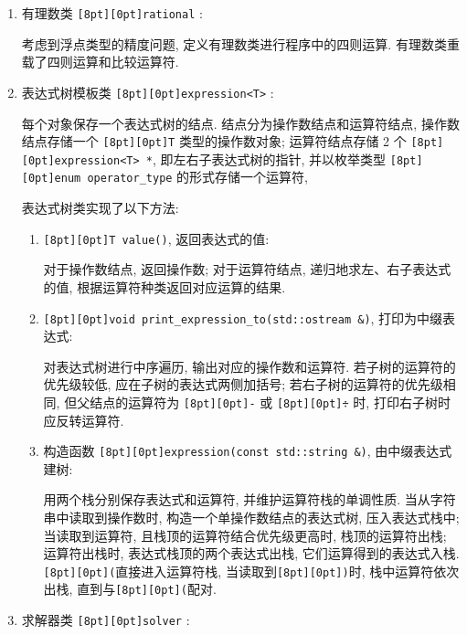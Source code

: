 \documentclass{ctexart}
\newcommand{\codebox}[1]{\colorbox[rgb]{0.9, 0.9, 0.9}{\texttt{\raisebox{0pt}[8pt][0pt]{#1}}}}
\begin{document}
\begin{enumerate}[itemindent=0pt, leftmargin=14pt]
    \item 有理数类 \codebox{rational} :
    
    考虑到浮点类型的精度问题, 定义有理数类进行程序中的四则运算. 有理数类重载了四则运算和比较运算符.

    \item 表达式树模板类 \codebox{expression<T>} :
    
    每个对象保存一个表达式树的结点. 结点分为操作数结点和运算符结点, 
    操作数结点存储一个 \codebox{T} 类型的操作数对象;
    运算符结点存储 2 个 \codebox{expression<T> *}, 即左右子表达式树的指针,
    并以枚举类型 \codebox{enum operator\_type} 的形式存储一个运算符,

    表达式树类实现了以下方法:

    \begin{enumerate}[itemindent=0pt, leftmargin=16pt]
        \item \codebox{T value()}, 返回表达式的值:
        
        对于操作数结点, 返回操作数; 对于运算符结点, 递归地求左、右子表达式的值, 根据运算符种类返回对应运算的结果.
        
        \item \codebox{void print\_expression\_to(std::ostream \&)}, 打印为中缀表达式:
        
        对表达式树进行中序遍历, 输出对应的操作数和运算符. 
        若子树的运算符的优先级较低, 应在子树的表达式两侧加括号;
        若右子树的运算符的优先级相同, 但父结点的运算符为 \codebox{-} 或 \codebox{÷} 时,
        打印右子树时应反转运算符.
        
        \item 构造函数 \codebox{expression(const std::string \&)}, 由中缀表达式建树:

        用两个栈分别保存表达式和运算符, 并维护运算符栈的单调性质.
        当从字符串中读取到操作数时, 构造一个单操作数结点的表达式树, 压入表达式栈中;
        当读取到运算符, 且栈顶的运算符结合优先级更高时, 栈顶的运算符出栈;
        运算符出栈时, 表达式栈顶的两个表达式出栈, 它们运算得到的表达式入栈.
        \codebox{(}直接进入运算符栈, 当读取到\codebox{)}时, 栈中运算符依次出栈, 直到与\codebox{(}配对.

    \end{enumerate}

    \newpage

    \item 求解器类 \codebox{solver} :
    

\end{enumerate}
\end{document}
